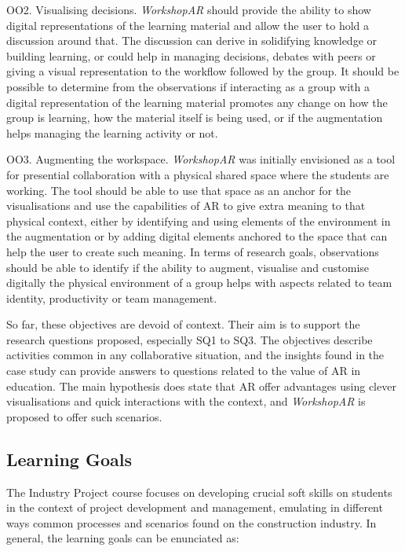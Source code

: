 \begin{displayquote}
    OO2. Visualising decisions. \emph{WorkshopAR} should provide the ability to show digital representations of the learning material and allow the user to hold a
    discussion around that. The discussion can derive in solidifying knowledge or building learning, or could help in managing decisions, debates with peers or giving a
    visual representation to the workflow followed by the group. It should be possible to determine from the observations if interacting as a group with a digital
    representation of the learning material promotes any change on how the group is learning, how the material itself is being used, or if the augmentation helps managing
    the learning activity or not.
\end{displayquote}

\begin{displayquote}
    OO3. Augmenting the workspace. \emph{WorkshopAR} was initially envisioned as a tool for presential collaboration with a physical shared space where the students are
    working. The tool should be able to use that space as an anchor for the visualisations and use the capabilities of \ac{AR} to give extra meaning to that physical
    context, either by identifying and using elements of the environment in the augmentation or by adding digital elements anchored to the space that can help the user to
    create such meaning. In terms of research goals, observations should be able to identify if the ability to augment, visualise and customise digitally the physical
    environment of a group helps with aspects related to team identity, productivity or team management.
\end{displayquote}

So far, these objectives are devoid of context. Their aim is to support the research questions proposed, especially SQ1 to SQ3. The objectives describe activities common
in any collaborative situation, and the insights found in the case study can provide answers to questions related to the value of \ac{AR} in education. The main hypothesis
does state that \ac{AR} offer advantages using clever visualisations and quick interactions with the context, and \emph{WorkshopAR} is proposed to offer such scenarios.

\subsection{Learning Goals \label{sec:4-1-2}}

The Industry Project course focuses on developing crucial soft skills on students in the context of project development and management, emulating in different ways common
processes and scenarios found on the construction industry. In general, the learning goals can be enunciated as:

